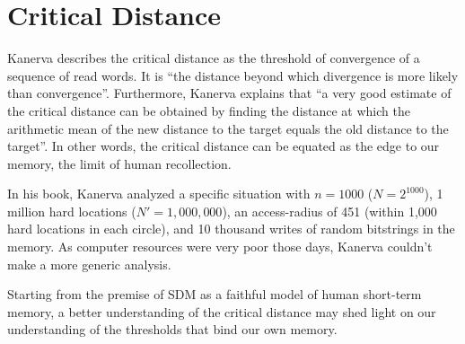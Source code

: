 \section{Critical Distance}

Kanerva describes the critical distance as the threshold of convergence of a sequence of read words. It is ``the distance beyond which divergence is more likely than convergence''\citep{Kanerva1988}. Furthermore, Kanerva explains that ``a very good estimate of the critical distance can be obtained by finding the distance at which the arithmetic mean of the new distance to the target equals the old distance to the target''\citep{Kanerva1988}.  In other words, the critical distance can be equated as the edge to our memory, the limit of human recollection.

In his book, Kanerva analyzed a specific situation with $n=1000$ ($N=2^{1000}$), 1 million hard locations ($N'=1,000,000$), an access-radius of 451 (within 1,000 hard locations in each circle), and 10 thousand writes of random bitstrings in the memory. As computer resources were very poor those days, Kanerva couldn't make a more generic analysis.

Starting from the premise of SDM as a faithful model of human short-term memory, a better understanding of the critical distance may shed light on our understanding of the thresholds that bind our own memory.



